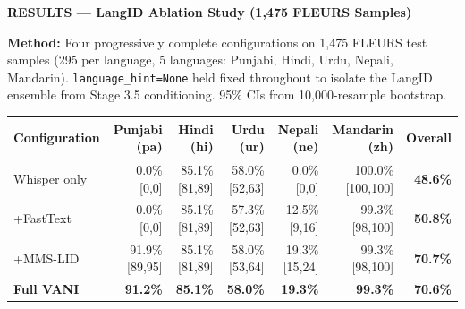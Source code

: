 \documentclass[11pt,a4paper]{article}
\begin{document}
\newpage

\begin{tcolorbox}[enhanced,colback=DGreen,colframe=DGreen,arc=5pt,boxrule=0pt,
  left=10pt,right=10pt,top=5pt,bottom=5pt]
{\large\bfseries\color{white}RESULTS --- LangID Ablation Study (1,475 FLEURS Samples)}
\end{tcolorbox}

\vspace{5pt}

\begin{tcolorbox}[enhanced,colback=LGray,colframe=MGray!50,arc=4pt,boxrule=0.7pt,
  left=7pt,right=7pt,top=5pt,bottom=5pt]
\small\textbf{Method:} Four progressively complete configurations on 1,475 FLEURS test samples (295 per language, 5 languages: Punjabi, Hindi, Urdu, Nepali, Mandarin). \texttt{language\_hint=None} held fixed throughout to isolate the LangID ensemble from Stage 3.5 conditioning. 95\% CIs from 10,000-resample bootstrap.
\end{tcolorbox}

\vspace{5pt}

{\small
\begin{tabular}{lrrrrr>{\bfseries}r}
\toprule
\rowcolor{Navy}
\color{white}\textbf{Configuration} &
\color{white}\textbf{Punjabi (pa)} &
\color{white}\textbf{Hindi (hi)} &
\color{white}\textbf{Urdu (ur)} &
\color{white}\textbf{Nepali (ne)} &
\color{white}\textbf{Mandarin (zh)} &
\color{white}\textbf{Overall}\\
\midrule
Whisper only     & \cellcolor{LRed}0.0\% [0,0]   & \cellcolor{LGreen}85.1\% [81,89] & \cellcolor{LAmber}58.0\% [52,63] & \cellcolor{LRed}0.0\% [0,0]   & \cellcolor{LGreen}100.0\% [100,100] & \cellcolor{LRed}48.6\%\\
+FastText        & \cellcolor{LRed}0.0\% [0,0]   & \cellcolor{LGreen}85.1\% [81,89] & \cellcolor{LAmber}57.3\% [52,63] & \cellcolor{LAmber}12.5\% [9,16]& \cellcolor{LGreen}99.3\% [98,100]  & \cellcolor{LRed}50.8\%\\
\rowcolor{LGreen!60}
+MMS-LID         & 91.9\% [89,95] & 85.1\% [81,89] & 58.0\% [53,64] & 19.3\% [15,24] & 99.3\% [98,100] & 70.7\%\\
\rowcolor{SkyBg}
\textbf{Full VANI} & \textbf{91.2\%} & \textbf{85.1\%} & \textbf{58.0\%} & \textbf{19.3\%} & \textbf{99.3\%} & \textbf{70.6\%}\\
\bottomrule
\end{tabular}
}
\end{document}
